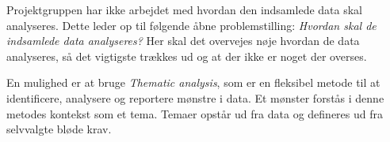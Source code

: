 Projektgruppen har ikke arbejdet med hvordan den indsamlede data skal analyseres.
Dette leder op til følgende åbne problemstilling: \textit{Hvordan skal de indsamlede data analyseres?}
Her skal det overvejes nøje hvordan de data analyseres, så det vigtigste trækkes ud og at der ikke er noget der overses.

En mulighed er at bruge \textit{Thematic analysis}\cite{thematic}, som er en fleksibel metode til at identificere, analysere og reportere mønstre i data.
Et mønster forstås i denne metodes kontekst som et tema.
Temaer opstår ud fra data og defineres ud fra selvvalgte bløde krav.
